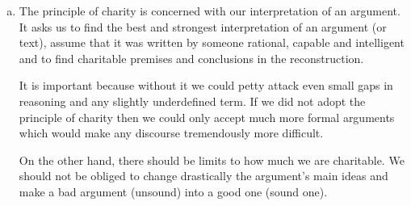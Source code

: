 \documentclass[a4paper, 11pt]{article}
\begin{document}
\begin{enumerate}[a)]
    \item
    The principle of charity is concerned with our interpretation of an argument.
    It asks us to find the best and strongest interpretation of an argument (or text), assume that it was written by someone rational, capable and intelligent and to find charitable premises and conclusions in the reconstruction.
    
    It is important because without it we could petty attack even small gaps in reasoning and any slightly underdefined term.
    If we did not adopt the principle of charity then we could only accept much more formal arguments which would make any discourse tremendously more difficult.
    
    On the other hand, there should be limits to how much we are charitable.
    We should not be obliged to change drastically the argument's main ideas and make a bad argument (unsound) into a good one (sound one).
\end{enumerate}

\end{document}
